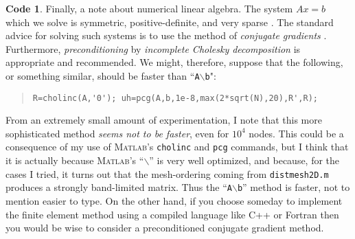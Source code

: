 \documentclass[12pt]{amsart}
\theoremstyle{definition}
\newtheorem*{code}{Code}
\newcommand{\mtt}{\texttt}
\newcommand{\Matlab}{\textsc{Matlab}\xspace}
\begin{document}
\begin{code}
Finally, a note about numerical linear algebra.  The system $Ax=b$ which we solve is symmetric, positive-definite, and very sparse \cite{Johnson}.  The standard advice for solving such systems is to use the method of \emph{conjugate gradients} \cite{TrefethenLA}.  Furthermore, \emph{preconditioning} by \emph{incomplete Cholesky decomposition} is appropriate and recommended.  We might, therefore, suppose that the following, or something similar, should be faster than ``\mtt{A$\backslash$b}":
\small\begin{quote}\begin{verbatim}
R=cholinc(A,'0'); uh=pcg(A,b,1e-8,max(2*sqrt(N),20),R',R);
\end{verbatim}
\end{quote}\normalsize
From an extremely small amount of experimentation, I note that this more sophisticated method \emph{seems not to be faster}, even for $10^4$ nodes.  This could be a consequence of my use of \Matlab's \mtt{cholinc} and \mtt{pcg} commands, but I think that it is actually because \Matlab's ``$\backslash$'' is very well optimized, and because, for the cases I tried, it turns out that the mesh-ordering coming from \mtt{distmesh2D.m} produces a strongly band-limited matrix.  Thus the ``\mtt{A$\backslash$b}'' method is faster, not to mention easier to type.  On the other hand, if you choose someday to implement the finite element method using a compiled language like C++ or Fortran then you would be wise to consider a preconditioned conjugate gradient method.

\end{code}











\end{document}
